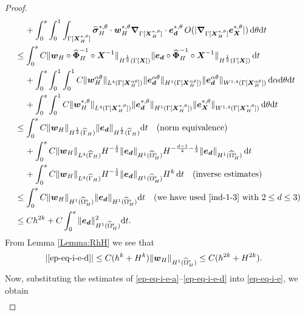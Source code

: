 \documentclass[11pt,reqno]{amsart}
\theoremstyle{definition}
\theoremstyle{plain}
\numberwithin{theorem}{section}
\numberwithin{proposition}{section}
\numberwithin{lemma}{section}
\numberwithin{equation}{section}
\newcommand{\bs}[1]{\boldsymbol{#1}}
\newcommand{\uu}[1]  {{\bs{#1}} }
\newcommand{\grad}   { \uu{\nabla}    }
\def\d{\mathrm{d}}
\newcommand{\bw}{{\bs w}}
\renewcommand{\(}{\bigl(}
\renewcommand{\)}{\bigr)}
\begin{document}
\begin{proof}
\begin{align}
&\quad\, + \int_0^s \int_0^1 \int_{\Gamma[\bs X_H^{*,\theta}]} {\widehat{\bs \sigma} }_H^{*,\theta}\cdot \bw_H^{*,\theta} \grad_{\Gamma[\bs X_H^{*,\theta}]}\cdot {\bs e}_{\bs d}^{*,\theta}\, O(|\grad_{\Gamma[\bs X_H^{*,\theta}]} {\bs e}_{\bs X}^{*,\theta}|)\,\d\theta \d t \notag\\
&\le \int_0^s C\|\bw_H\circ\widehat{\bs\Phi}_H^{-1}\circ{\bs X}^{-1}\|_{H^{\frac12}(\Gamma[\bs X])} \|{\bs e}_{\bs d}\circ\widehat{\bs\Phi}_H^{-1}\circ{\bs X}^{-1}\|_{H^{\frac12}(\Gamma[\bs X])} \, \d t \notag\\
&\quad\, 
+ \int_0^s \int_0^1 \int_0^1  C\|\bw_H^{\alpha\theta}\|_{L^4(\Gamma[\bs X_H^{\alpha\theta}])} 
\|{\bs e}_{\bs d}^{\alpha\theta}\|_{H^1(\Gamma[\bs X_H^{\alpha\theta}])} 
\|{\bs e}_{\bs d}^{\alpha\theta}\|_{W^{1,4}(\Gamma[\bs X_H^{\alpha\theta}])}\, \d\alpha\d\theta\d t\notag\\
&\quad\, 
+ \int_0^s \int_0^1 C\|\bw_H^{*,\theta}\|_{L^4(\Gamma[\bs X_H^{*,\theta}])} 
\|{\bs e}_{\bs d}^{*,\theta}\|_{H^1(\Gamma[\bs X_H^{*,\theta}])} 
\|{\bs e}_{\bs X}^{*,\theta}\|_{W^{1,4}(\Gamma[\bs X_H^{*,\theta}])}\, \d\theta\d t\notag\\
&\le \int_0^s C\|\bw_H\|_{H^{\frac12}(\widehat\Gamma_H)} \|{\bs e}_{\bs d}\|_{H^{\frac12}(\widehat\Gamma_H)} \d t 
\quad\mbox{(norm equivalence)} \notag\\
&\quad\, 
+ \int_0^sC\|\bw_H\|_{L^4(\widehat\Gamma_H)} 
H^{-\frac12}\|{\bs e}_{\bs d}\|_{H^1(\widehat{\Omega}_H^{\rm s})} 
H^{-\frac{d-1}{4}-\frac12}\|{\bs e}_{\bs d}\|_{H^1(\widehat{\Omega}_H^{\rm s})}\, \d t \notag\\
&\quad\, 
+ \int_0^s C\|\bw_H\|_{L^4(\widehat\Gamma_H)} 
H^{-\frac12}\|{\bs e}_{\bs d}\|_{H^1(\widehat{\Omega}_H^{\rm s})} H^k \, \d t \quad\mbox{(inverse estimates)}\notag\\
&\le \int_0^s C\|\bw_H\|_{H^1(\widehat{\Omega}_H^{\rm s})} \|{\bs e}_{\bs d}\|_{H^1(\widehat{\Omega}_H^{\rm s})} \d t \quad\mbox{(we have used \eqref{ind-1-3} with $2\le d\le 3$)}\notag\\
&\le Ch^{2k} + C\int_0^s \|{\bs e}_{\bs d}\|_{H^1(\widehat{\Omega}_H^{\rm s})}^2 \d t.
\end{align}
From Lemma \ref{Lemma:RhH} we see that 
\begin{align}
|\eqref{ep-eq-i-e-d}|
&\le C(h^k+H^k) \|{\bs w}_H\|_{H^1(\widehat{\Omega}_H^{\rm s})} 
\le C(h^{2k}+H^{2k}) .
\end{align}
Now, substituting the estimates of \eqref{ep-eq-i-e-a}--\eqref{ep-eq-i-e-d} into \eqref{ep-eq-i-e}, we obtain 
\begin{align}%

\end{align}
\end{proof}
\end{document}
